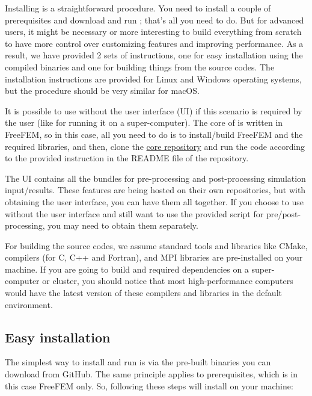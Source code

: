 Installing \biodeg{} is a straightforward procedure. You need to install a couple of prerequisites and download and run \biodeg{}; that's all you need to do. But for advanced users, it might be necessary or more interesting to build everything from scratch to have more control over customizing features and improving performance. As a result, we have provided 2 sets of instructions, one for easy installation using the compiled binaries and one for building things from the source codes. The installation instructions are provided for Linux and Windows operating systems, but the procedure should be very similar for macOS. 

It is possible to use \biodeg{} without the user interface (UI) if this scenario is required by the user (like for running it on a super-computer). The core of \biodeg{} is written in FreeFEM, so in this case, all you need to do is to install/build FreeFEM and the required libraries, and then, clone the \href{https://github.com/mbarzegary/BioDeg}{\biodeg{} core repository} and run the code according to the provided instruction in the README file of the repository.

The \biodeg{} UI contains all the bundles for pre-processing and post-processing simulation input/results. These features are being hosted on their own repositories, but with obtaining the user interface, you can have them all together. If you choose to use \biodeg{} without the user interface and still want to use the provided script for pre/post-processing, you may need to obtain them separately.

For building the source codes, we assume standard tools and libraries like CMake, compilers (for C, C++ and Fortran), and MPI libraries are pre-installed on your machine. If you are going to build \biodeg{} and required dependencies on a super-computer or cluster, you should notice that most high-performance computers would have the latest version of these compilers and libraries in the default environment.

\subsection{Easy installation}

The simplest way to install and run \biodeg{} is via the pre-built binaries you can download from GitHub. The same principle applies to prerequisites, which is in this case FreeFEM only. So, following these steps will install \biodeg{} on your machine:

